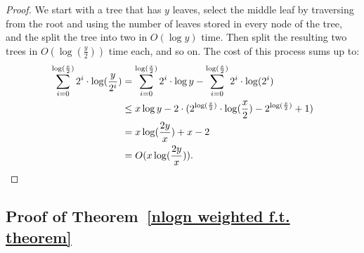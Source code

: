 \documentclass[a4paper,UKenglish]{lipics-v2016}
\theoremstyle{plain}
\begin{document}
\runningtimetoobtainsmalltreeslemma*

\begin{proof}
We start with a tree that has $y$ leaves, select the middle leaf by traversing from the root and using the number of leaves stored in every node of the tree, and the split the tree into two in $O(\log y)$ time. Then split the resulting two trees in $O(\log(\frac{y}{2}))$ time each, and so on. The cost of this process sums up to:
\begin{align*}
 \sum_{i=0}^{\log (\frac{x}{2})} 2^i \cdot \log (\frac{y}{2^i}) & = \sum_{i=0}^{\log (\frac{x}{2})} 2^i \cdot \log y - \sum_{i=0}^{\log (\frac{x}{2})} 2^i \cdot \log (2^i)  \\
& \leq x \log y - 2 \cdot (2^{ \log ( \frac{x}{2})} \cdot \log ( \frac{x}{2}) - 2^{ \log ( \frac{x}{2})}+1)  \\
&= x \log (\frac{2y}{x}) + x -2 \\
& = O(x \log (\frac{2y}{x})) .\qedhere
\end{align*}
\end{proof}


\subsection{Proof of Theorem~\ref{nlogn weighted f.t. theorem}}\label{appendix proof of nlogn theorem}

\nlognweighted*
\end{document}
